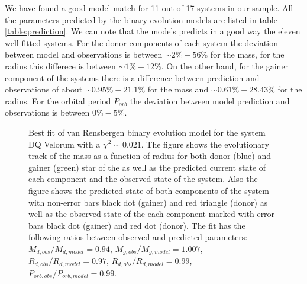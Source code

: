 \indent We have found a good model match for 11 out of 17 systems in our sample. All the parameters predicted by the \citet{vanrensbergen2008, vanrensbergen2011} binary evolution models are listed in table \ref{table:prediction}. We can note that the models predicts in a good way the eleven well fitted systems. For the donor components of each system the deviation between model and observations is between $\sim 2\% - 56\%$ for the mass, for the radius this differece is between $\sim 1\% - 12\%$. On the other hand, for the gainer component of the systems there is a difference between prediction and observations of about $\sim 0.95\% - 21.1\%$ for the mass and $\sim 0.61\% - 28.43\%$ for the radius. For the orbital period $P_{orb}$ the deviation between model prediction and observations is between $0\% - 5\%$.


\begin{figure}[h!]
  \caption{Best fit of van Rensbergen binary evolution model for the system DQ Velorum with a $\chi^{2}\sim 0.021$. The figure shows the evolutionary track of the mass as a function of radius for both donor (blue) and gainer (green) star of the as well as the predicted current state of each component and the observed state of the system. Also the figure shows the predicted state of both components of the system with non-error bars black dot (gainer) and red triangle (donor) as well as the observed state of the each component marked with error bars black dot (gainer) and red dot (donor). The fit has the following ratios between observed and predicted parameters: $M_{d, obs}/M_{d, model}=0.94$, $M_{g, obs}/M_{g, model}=1.007$, $R_{d, obs}/R_{d, model}=0.97$, $R_{d, obs}/R_{d, model}=0.99$, $P_{orb, obs}/P_{orb, model}=0.99$.}
  \label{dqvel_fit}
\end{figure}



